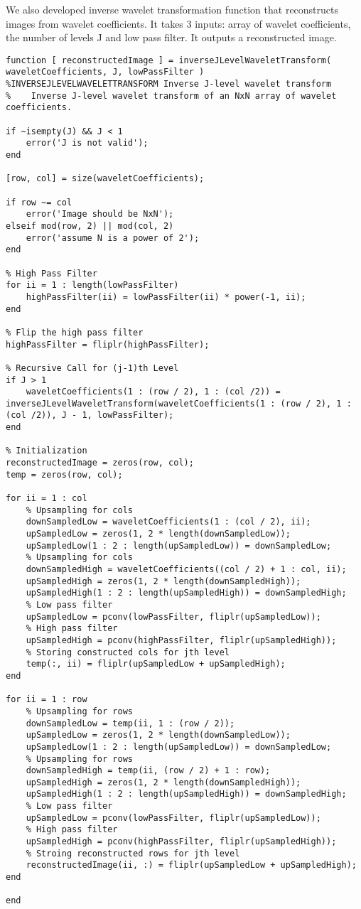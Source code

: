 \documentclass{article}
\begin{document}
We also developed inverse wavelet transformation function that reconstructs images from wavelet coefficients. It takes 3 inputs: array of wavelet coefficients, the number of levels J and low pass filter. It outputs a reconstructed image.

\begin{lstlisting}[label=waveletTransform, caption=jLevelWaveletTransform.m]	
function [ reconstructedImage ] = inverseJLevelWaveletTransform( waveletCoefficients, J, lowPassFilter )
%INVERSEJLEVELWAVELETTRANSFORM Inverse J-level wavelet transform
%    Inverse J-level wavelet transform of an NxN array of wavelet coefficients.

if ~isempty(J) && J < 1
    error('J is not valid');
end

[row, col] = size(waveletCoefficients);

if row ~= col
    error('Image should be NxN');
elseif mod(row, 2) || mod(col, 2)
    error('assume N is a power of 2');
end

% High Pass Filter
for ii = 1 : length(lowPassFilter)
    highPassFilter(ii) = lowPassFilter(ii) * power(-1, ii);
end

% Flip the high pass filter
highPassFilter = fliplr(highPassFilter);

% Recursive Call for (j-1)th Level
if J > 1
    waveletCoefficients(1 : (row / 2), 1 : (col /2)) = inverseJLevelWaveletTransform(waveletCoefficients(1 : (row / 2), 1 : (col /2)), J - 1, lowPassFilter);
end

% Initialization
reconstructedImage = zeros(row, col);
temp = zeros(row, col);

for ii = 1 : col
    % Upsampling for cols
    downSampledLow = waveletCoefficients(1 : (col / 2), ii);
    upSampledLow = zeros(1, 2 * length(downSampledLow));
    upSampledLow(1 : 2 : length(upSampledLow)) = downSampledLow;
    % Upsampling for cols
    downSampledHigh = waveletCoefficients((col / 2) + 1 : col, ii);
    upSampledHigh = zeros(1, 2 * length(downSampledHigh));
    upSampledHigh(1 : 2 : length(upSampledHigh)) = downSampledHigh;
    % Low pass filter
    upSampledLow = pconv(lowPassFilter, fliplr(upSampledLow));
    % High pass filter
    upSampledHigh = pconv(highPassFilter, fliplr(upSampledHigh));
    % Storing constructed cols for jth level
    temp(:, ii) = fliplr(upSampledLow + upSampledHigh);
end

for ii = 1 : row
    % Upsampling for rows
    downSampledLow = temp(ii, 1 : (row / 2));
    upSampledLow = zeros(1, 2 * length(downSampledLow));
    upSampledLow(1 : 2 : length(upSampledLow)) = downSampledLow;
    % Upsampling for rows
    downSampledHigh = temp(ii, (row / 2) + 1 : row);
    upSampledHigh = zeros(1, 2 * length(downSampledHigh));
    upSampledHigh(1 : 2 : length(upSampledHigh)) = downSampledHigh;
    % Low pass filter
    upSampledLow = pconv(lowPassFilter, fliplr(upSampledLow));
    % High pass filter
    upSampledHigh = pconv(highPassFilter, fliplr(upSampledHigh));
    % Stroing reconstructed rows for jth level
    reconstructedImage(ii, :) = fliplr(upSampledLow + upSampledHigh);
end

end

\end{lstlisting}
\end{document}

